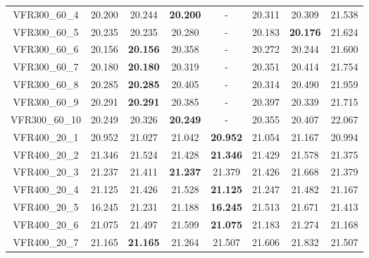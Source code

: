 \begin{tabular}{cc|ccc|ccc}
VFR300\_60\_4      & 20.200           & 20.244           & {\bf 20.200}     & -                & 20.311           & 20.309           & 21.538          \\ 
VFR300\_60\_5      & 20.235           & 20.235           & 20.280           & -                & 20.183           & {\bf 20.176}     & 21.624          \\ 
VFR300\_60\_6      & 20.156           & {\bf 20.156}     & 20.358           & -                & 20.272           & 20.244           & 21.600          \\ 
VFR300\_60\_7      & 20.180           & {\bf 20.180}     & 20.319           & -                & 20.351           & 20.414           & 21.754          \\ 
VFR300\_60\_8      & 20.285           & {\bf 20.285}     & 20.405           & -                & 20.314           & 20.490           & 21.959          \\ 
VFR300\_60\_9      & 20.291           & {\bf 20.291}     & 20.385           & -                & 20.397           & 20.339           & 21.715          \\ 
VFR300\_60\_10     & 20.249           & 20.326           & {\bf 20.249}     & -                & 20.355           & 20.407           & 22.067          \\ 
VFR400\_20\_1      & 20.952           & 21.027           & 21.042           & {\bf 20.952}     & 21.054           & 21.167           & 20.994          \\ 
VFR400\_20\_2      & 21.346           & 21.524           & 21.428           & {\bf 21.346}     & 21.429           & 21.578           & 21.375          \\ 
VFR400\_20\_3      & 21.237           & 21.411           & {\bf 21.237}     & 21.379           & 21.426           & 21.668           & 21.379          \\ 
VFR400\_20\_4      & 21.125           & 21.426           & 21.528           & {\bf 21.125}     & 21.247           & 21.482           & 21.167          \\ 
VFR400\_20\_5      & 16.245           & 21.231           & 21.188           & {\bf 16.245}     & 21.513           & 21.671           & 21.413          \\ 
VFR400\_20\_6      & 21.075           & 21.497           & 21.599           & {\bf 21.075}     & 21.183           & 21.274           & 21.168          \\ 
VFR400\_20\_7      & 21.165           & {\bf 21.165}     & 21.264           & 21.507           & 21.606           & 21.832           & 21.507          \\ 

\end{tabular}
